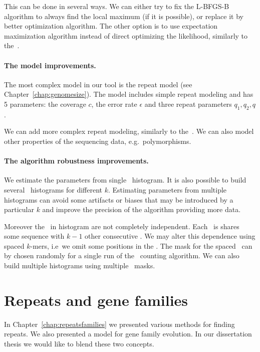 This can be done in several ways. We can either try to fix the L-BFGS-B algorithm to always find the local maximum (if it is possible), or replace it by better optimization algorithm. The other option is to use expectation maximization algorithm instead of direct optimizing the likelihood, similarly to the~\cite{waterman}.

\paragraph{The model improvements.}
The most complex model in our tool is the repeat model (see Chapter~\ref{chap:genomesize}). The model includes simple repeat modeling and has 5 parameters: the coverage $c$, the error rate $\epsilon$ and three repeat parameters $q_1, q_2, q$.

We can add more complex repeat modeling, similarly to the~\cite{williams}. We can also model other properties of the sequencing data, e.g.\ polymorphisms.

\paragraph{The algorithm robustness improvements.}

We estimate the parameters from single \kmer\ histogram. It is also possible to build several \kmer\ histograms for different $k$. Estimating parameters from multiple histograms can avoid some artifacts or biases that may be introduced by a particular $k$ and improve the precision of the algorithm providing more data.

Moreover the \kmers\ in histogram are not completely independent. Each \kmer\ is shares some sequence with $k-1$ other consecutive \kmers. We may alter this dependence using spaced $k$-mers, i.e\ we omit some positions in the \kmer.
The mask for the spaced \kmers\ can by chosen randomly for a single run of the \kmer\ counting algorithm. We can also build multiple histograms using multiple \kmer\ masks.

\section{Repeats and gene families}\label{sect:repeats-families}

In Chapter~\ref{chap:repeatsfamilies} we presented various methods for finding repeats. We also presented a model for gene family evolution.
In our dissertation thesis we would like to blend these two concepts.

